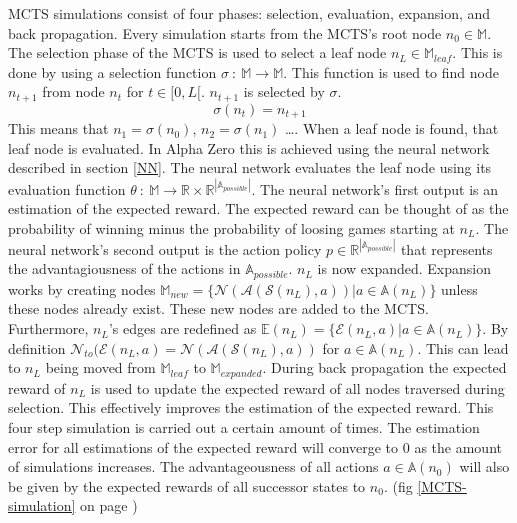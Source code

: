 \documentclass[12pt]{article}
\newcommand{\imgRef}[1]{(fig \ref{#1} on page \pageref{#1})}
\begin{document}
MCTS simulations consist of four phases: selection, evaluation, expansion, and back propagation. Every simulation starts from the MCTS's root node \(n_0 \in \mathbb{M}\). The selection phase of the MCTS is used to select a leaf node \(n_L \in \mathbb{M}_{leaf}\). This is done by using a selection function \(\sigma~:~\mathbb{M}\to\mathbb{M}\). This function is used to find node \(n_{t+1}\) from node \(n_t\) for \(t\in [0,L[\). \(n_{t+1}\) is selected by \(\sigma\).
\begin{equation}
\sigma(n_t) = n_{t+1}
\end{equation}
 This means that \(n_1 = \sigma(n_0)\), \(n_2 =  \sigma(n_1)\) \dots. When a leaf node is found, that leaf node is evaluated. In Alpha Zero this is achieved using the neural network described in section \ref{NN}. The neural network evaluates the leaf node using its evaluation function \(\theta~:~\mathbb{M}\to \mathbb{R}\times\mathbb{R}^{|\mathbb{A}_{possible}|}\). The neural network's first output is an estimation of the expected reward. The expected reward can be thought of as the probability of winning minus the probability of loosing games starting at \(n_L\). The neural network's second output is the action policy \(p\in\mathbb{R}^{|\mathbb{A}_{possible}|}\) that represents the advantagiousness of the actions in \(\mathbb{A}_{possible}\). \(n_L\) is now expanded. Expansion works by creating nodes \(\mathbb{M}_{new} = \{\mathcal{N}(\mathcal{A}(\mathcal{S}(n_L), a)) | a \in \mathbb{A}(n_L)\}\) unless these nodes already exist. These new nodes are added to the MCTS. Furthermore, \(n_L\)'s edges are redefined as \(\mathbb{E}(n_L) = \{\mathcal{E}(n_L, a) | a \in \mathbb{A}(n_L)\}\). By definition \(\mathcal{N}_{to}(\mathcal{E}(n_L, a) = \mathcal{N}(\mathcal{A}(\mathcal{S}(n_L), a))\) for \(a\in\mathbb{A}(n_L)\). This can lead to \(n_L\) being moved from \(\mathbb{M}_{leaf}\) to \(\mathbb{M}_{expanded}\). During back propagation the expected reward of \(n_L\) is used to update the expected reward of all nodes traversed during selection. This effectively improves the estimation of the expected reward. This four step simulation is carried out a certain amount of times. The estimation error for all estimations of the expected reward will converge to \(0\) as the amount of simulations increases. The advantageousness of all actions \(a  \in \mathbb{A}(n_0)\) will also be given by the expected rewards of all successor states to \(n_0\). \imgRef{MCTS-simulation}
\end{document}
